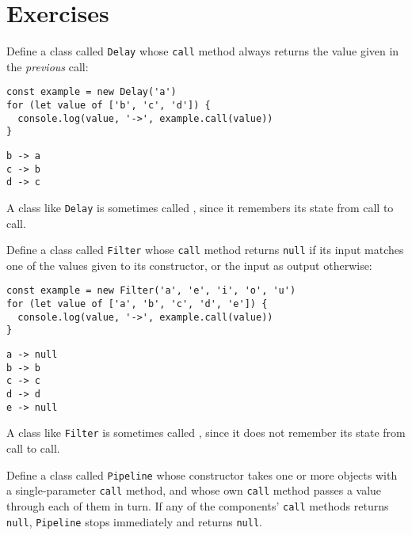 
\section{Exercises}\label{s:oop-exercises}


Define a class called \texttt{Delay} whose \texttt{call} method always returns
the value given in the \emph{previous} call:

\begin{verbatim}
const example = new Delay('a')
for (let value of ['b', 'c', 'd']) {
  console.log(value, '->', example.call(value))
}
\end{verbatim}

\begin{verbatim}
b -> a
c -> b
d -> c
\end{verbatim}

A class like \texttt{Delay} is sometimes called ,
since it remembers its state from call to call.


Define a class called \texttt{Filter} whose \texttt{call} method returns \texttt{null}
if its input matches one of the values given to its constructor,
or the input as output otherwise:

\begin{verbatim}
const example = new Filter('a', 'e', 'i', 'o', 'u')
for (let value of ['a', 'b', 'c', 'd', 'e']) {
  console.log(value, '->', example.call(value))
}
\end{verbatim}

\begin{verbatim}
a -> null
b -> b
c -> c
d -> d
e -> null
\end{verbatim}

A class like \texttt{Filter} is sometimes called ,
since it does not remember its state from call to call.


Define a class called \texttt{Pipeline}
whose constructor takes one or more objects with a single-parameter \texttt{call} method,
and whose own \texttt{call} method passes a value through each of them in turn.
If any of the components' \texttt{call} methods returns \texttt{null},
\texttt{Pipeline} stops immediately and returns \texttt{null}.

